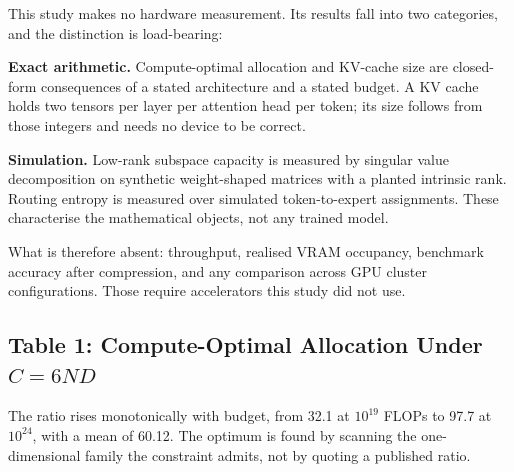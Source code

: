 \documentclass[10pt,twocolumn,letterpaper]{article}
\begin{document}
This study makes no hardware measurement. Its results fall into two categories, and the distinction is load-bearing:

\textbf{Exact arithmetic.} Compute-optimal allocation and KV-cache size are closed-form consequences of a stated architecture and a stated budget. A KV cache holds two tensors per layer per attention head per token; its size follows from those integers and needs no device to be correct.

\textbf{Simulation.} Low-rank subspace capacity is measured by singular value decomposition on synthetic weight-shaped matrices with a planted intrinsic rank. Routing entropy is measured over simulated token-to-expert assignments. These characterise the mathematical objects, not any trained model.

What is therefore absent: throughput, realised VRAM occupancy, benchmark accuracy after compression, and any comparison across GPU cluster configurations. Those require accelerators this study did not use.


\subsection{Table 1: Compute-Optimal Allocation Under $C = 6ND$}
\begin{table}[htbp]
\centering
{}
\end{table}

The ratio rises monotonically with budget, from 32.1 at $10^{19}$ FLOPs to 97.7 at $10^{24}$, with a mean of 60.12. The optimum is found by scanning the one-dimensional family the constraint admits, not by quoting a published ratio.
\end{document}
